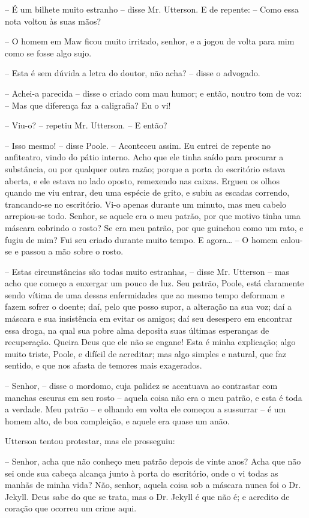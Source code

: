 -- É um bilhete muito estranho -- disse Mr. Utterson.  E de repente: --
Como essa nota voltou às suas mãos?

-- O homem em Maw ficou muito irritado, senhor, e a jogou de volta para
mim como se fosse algo sujo.

-- Esta é sem dúvida a letra do doutor, não acha? -- disse o advogado.

-- Achei-a parecida -- disse o criado com mau humor; e então, noutro tom
de voz: -- Mas que diferença faz a caligrafia?  Eu o vi!

-- Viu-o? -- repetiu Mr. Utterson. -- E então?

-- Isso mesmo! -- disse Poole. -- Aconteceu assim.  Eu entrei de repente
no anfiteatro, vindo do pátio interno.  Acho que ele tinha saído para
procurar a substância, ou por qualquer outra razão; porque a porta do
escritório estava aberta, e ele estava no lado oposto, remexendo nas
caixas. Ergueu os olhos quando me viu entrar, deu uma espécie de grito,
e subiu as escadas correndo, trancando-se no escritório.  Vi-o apenas
durante um minuto, mas meu cabelo arrepiou-se todo.  Senhor, se aquele
era o meu patrão, por que motivo tinha uma máscara cobrindo o rosto? Se
era meu patrão, por que guinchou como um rato, e fugiu de mim?  Fui seu
criado durante muito tempo.  E agora\ldots{} -- O homem calou-se e passou a
mão sobre o rosto.

-- Estas circunstâncias são todas muito estranhas, -- disse Mr. Utterson
-- mas acho que começo a enxergar um pouco de luz.  Seu patrão, Poole,
está claramente sendo vítima de uma dessas enfermidades que ao mesmo
tempo deformam e fazem sofrer o doente; daí, pelo que posso supor, a
alteração na sua voz; daí a máscara e sua insistência em evitar os
amigos; daí seu desespero em encontrar essa droga, na qual sua pobre
alma deposita suas últimas esperanças de recuperação.  Queira Deus que
ele não se engane!  Esta é minha explicação; algo muito triste, Poole,
e difícil de acreditar; mas algo simples e natural, que faz sentido, e
que nos afasta de temores mais exagerados.

-- Senhor, -- disse o mordomo, cuja palidez se acentuava ao contrastar
com manchas escuras em seu rosto -- aquela coisa não era o meu patrão,
e esta é toda a verdade.  Meu patrão -- e olhando em volta ele começou a
sussurrar -- é um homem alto, de boa compleição, e aquele era quase um
anão. 

Utterson tentou protestar, mas ele prosseguiu:

-- Senhor, acha que não conheço meu patrão depois de vinte anos?  Acha
que não sei onde sua cabeça alcança junto à porta do escritório, onde o
vi todas as manhãs de minha vida?  Não, senhor, aquela coisa sob a
máscara nunca foi o Dr. Jekyll.  Deus sabe do que se trata, mas o Dr.
Jekyll é que não é; e acredito de coração que ocorreu um crime aqui.

